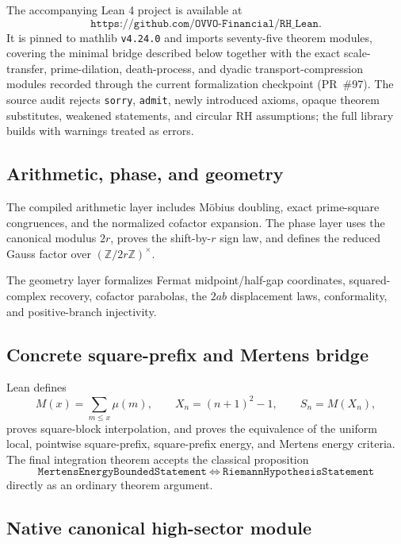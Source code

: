 \documentclass[11pt]{article}
\theoremstyle{definition}
\theoremstyle{remark}
\newcommand{\1}{\mathbf{1}}
\begin{document}
The accompanying Lean 4 project is available at
\[
 \texttt{https://github.com/OVVO-Financial/RH\_Lean}.
\]
It is pinned to mathlib \texttt{v4.24.0} and imports seventy-five theorem modules, covering the minimal bridge described below together with the exact scale-transfer, prime-dilation, death-process, and dyadic transport-compression modules recorded through the current formalization checkpoint (PR~\#97).  The source audit rejects \texttt{sorry}, \texttt{admit}, newly introduced axioms, opaque theorem substitutes, weakened statements, and circular RH assumptions; the full library builds with warnings treated as errors.

\subsection{Arithmetic, phase, and geometry}

The compiled arithmetic layer includes M\"obius doubling, exact prime-square congruences, and the normalized cofactor expansion.  The phase layer uses the canonical modulus $2r$, proves the shift-by-$r$ sign law, and defines the reduced Gauss factor over $(\mathbb Z/2r\mathbb Z)^\times$.

The geometry layer formalizes Fermat midpoint/half-gap coordinates, squared-complex recovery, cofactor parabolas, the $2ab$ displacement laws, conformality, and positive-branch injectivity.

\subsection{Concrete square-prefix and Mertens bridge}

Lean defines
\[
 M(x)=\sum_{m\le x}\mu(m),
 \qquad
 X_n=(n+1)^2-1,
 \qquad
 S_n=M(X_n),
\]
proves square-block interpolation, and proves the equivalence of the uniform local, pointwise square-prefix, square-prefix energy, and Mertens energy criteria.  The final integration theorem accepts the classical proposition
\[
 \texttt{MertensEnergyBoundedStatement}
 \ \Longleftrightarrow\ 
 \texttt{RiemannHypothesisStatement}
\]
directly as an ordinary theorem argument.

\subsection{Native canonical high-sector module}
\end{document}
